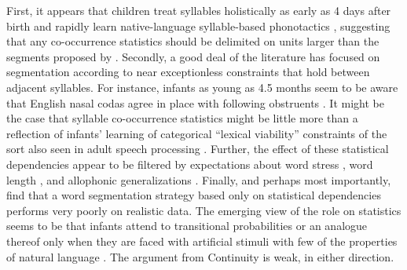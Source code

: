 First, it appears that children treat syllables holistically as early as 4 days after birth \citep{Bijeljac-Babic1993} and rapidly learn native-language syllable-based phonotactics \citep{Onishi2002,Chambers2003}, suggesting that any co-occurrence statistics should be delimited on units larger than the segments proposed by \citeauthor{Saffran1996}. Secondly, a good deal of the literature has focused on segmentation according to near exceptionless constraints that hold between adjacent syllables. For instance, infants as young as 4.5 months seem to be aware that English nasal codas agree in place with following obstruents \citep{Mattys2001b,Jusczyk2002,Davidson2004}. It might be the case that syllable co-occurrence statistics might be little more than a reflection of infants' learning of categorical ``lexical viability'' constraints \citep{Johnson2003} of the sort also seen in adult speech processing \citep[e.g.,][]{Norris1997}. Further, the effect of these statistical dependencies appear to be filtered by expectations about word stress \citep{Johnson2001,Mattys2001a,Shukla2007}, word length \citep{Lew-Williams2012}, and allophonic generalizations \citep{Hohne1994,Jusczyk1999c}. Finally, and perhaps most importantly, \citet{Gambell2005} find that a word segmentation strategy based only on statistical dependencies performs very poorly on realistic data. The emerging view of the role on statistics seems to be that infants attend to transitional probabilities or an analogue thereof only when they are faced with artificial stimuli with few of the properties of natural language \citep[e.g.,][]{Shukla2007,Lew-Williams2011}. The argument from Continuity is weak, in either direction.
